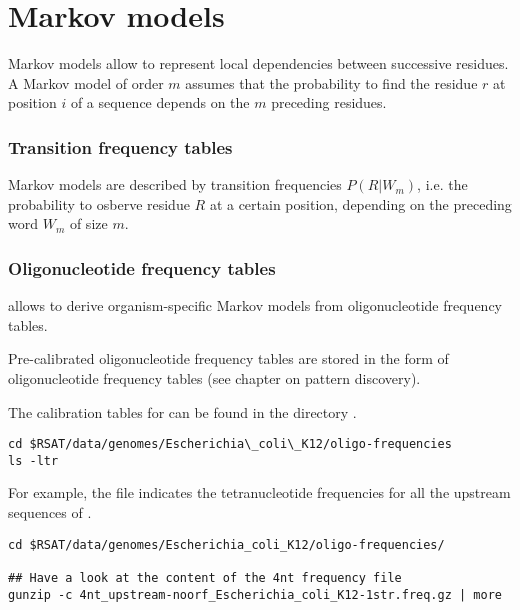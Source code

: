 
\chapter{Markov models}

Markov models allow to represent local dependencies between successive
residues. A Markov model of order $m$ assumes that the probability to
find the residue $r$ at position $i$ of a sequence depends on the
$m$ preceding residues.

\subsection{Transition frequency tables}

Markov models are described by transition frequencies $P(R|W_m)$,
i.e. the probability to osberve residue $R$ at a certain position,
depending on the preceding word $W_m$ of size $m$.

\subsection{Oligonucleotide frequency tables}

\RSAT allows to derive organism-specific Markov models from
oligonucleotide frequency tables.

Pre-calibrated oligonucleotide frequency tables are stored in the form
of oligonucleotide frequency tables (see chapter on pattern
discovery).

The calibration tables for  can be found in
the \RSAT directory .

\begin{small}
\begin{verbatim}
cd $RSAT/data/genomes/Escherichia\_coli\_K12/oligo-frequencies
ls -ltr
\end{verbatim}
\end{small}

For example, the file
indicates the tetranucleotide frequencies for all the upstream
sequences of .

\begin{small}
\begin{verbatim}
cd $RSAT/data/genomes/Escherichia_coli_K12/oligo-frequencies/

## Have a look at the content of the 4nt frequency file
gunzip -c 4nt_upstream-noorf_Escherichia_coli_K12-1str.freq.gz | more
\end{verbatim}
\end{small}

